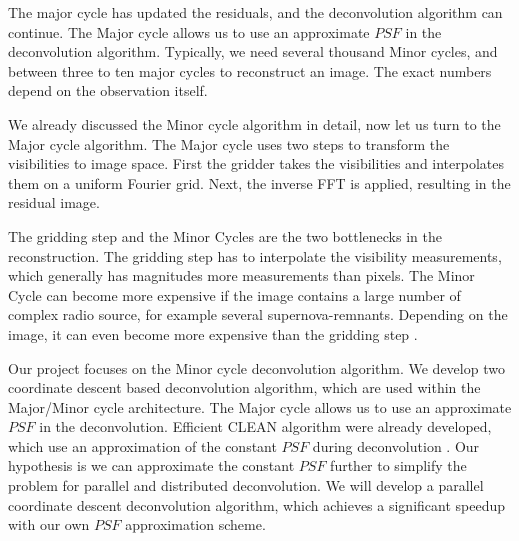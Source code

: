 The major cycle has updated the residuals, and the deconvolution algorithm can continue. The Major cycle allows us to use an approximate $PSF$ in the deconvolution algorithm. Typically, we need several thousand Minor cycles, and between three to ten major cycles to reconstruct an image. The exact numbers depend on the observation itself.

We already discussed the Minor cycle algorithm in detail, now let us turn to the Major cycle algorithm. The Major cycle uses two steps to transform the visibilities to image space. First the gridder takes the visibilities and interpolates them on a uniform Fourier grid. Next, the inverse FFT is applied, resulting in the residual image. 

The gridding step and the Minor Cycles are the two bottlenecks in the reconstruction. The gridding step has to interpolate the visibility measurements, which generally has magnitudes more measurements than pixels. The Minor Cycle can become more expensive if the image contains a large number of complex radio source, for example several supernova-remnants. Depending on the image, it can even become more expensive than the gridding step \cite{offringa2017optimized}.

Our project focuses on the Minor cycle deconvolution algorithm. We develop two coordinate descent based deconvolution algorithm, which are used within the Major/Minor cycle architecture. The Major cycle allows us to use an approximate $PSF$ in the deconvolution. Efficient CLEAN algorithm were already developed, which use an approximation of the constant $PSF$ during deconvolution \cite{clark1980efficient}. Our hypothesis is we can approximate the constant $PSF$ further to simplify the problem for parallel and distributed deconvolution. We will develop a parallel coordinate descent deconvolution algorithm, which achieves a significant speedup with our own $PSF$ approximation scheme.

